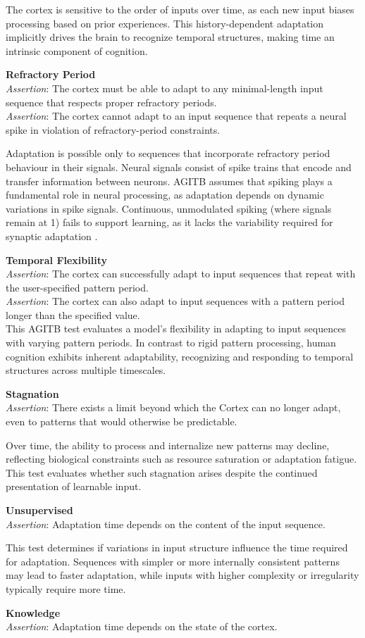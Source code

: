 \documentclass{article}
\newcommand{\agitbtest}[2]{
  \item
  \begin{minipage}[t]{\linewidth}
    \textbf{#1} \\[0.5ex]
    #2
  \end{minipage}
}
\begin{document}
\begin{agitblist}
{The cortex is sensitive to the order of inputs over time, as each new input biases processing based on prior experiences. This history-dependent adaptation implicitly drives the brain to recognize temporal structures, making time an intrinsic component of cognition.
}
\agitbtest{Refractory Period}{
\emph{Assertion}: The cortex must be able to adapt to any minimal-length input sequence that respects proper refractory periods.\\
\emph{Assertion}: The cortex cannot adapt to an input sequence that repeats a neural spike in violation of refractory-period constraints.

Adaptation is possible only to sequences that incorporate refractory period behaviour in their signals. Neural signals consist of spike trains that encode and transfer information between neurons. AGITB assumes that spiking plays a fundamental role in neural processing, as adaptation depends on dynamic variations in spike signals. Continuous, unmodulated spiking (where signals remain at 1) fails to support learning, as it lacks the variability required for synaptic adaptation \cite{Gerstner2002}. 
}
\agitbtest{Temporal Flexibility}{
\emph{Assertion}: The cortex can successfully adapt to input sequences that repeat with the user-specified pattern period.\\
\emph{Assertion}: The cortex can also adapt to input sequences with a pattern period longer than the specified value.\\

This AGITB test evaluates a model’s flexibility in adapting to input sequences with varying pattern periods. In contrast to rigid pattern processing, human cognition exhibits inherent adaptability, recognizing and responding to temporal structures across multiple timescales.
}
\agitbtest{Stagnation}{
\emph{Assertion}: There exists a limit beyond which the Cortex can no longer adapt, even to patterns that would otherwise be predictable.

Over time, the ability to process and internalize new patterns may decline, reflecting biological constraints such as resource saturation or adaptation fatigue. This test evaluates whether such stagnation arises despite the continued presentation of learnable input.
}
\agitbtest{Unsupervised}{
\emph{Assertion}: Adaptation time depends on the content of the input sequence.

This test determines if variations in input structure influence the time required for adaptation. Sequences with simpler or more internally consistent patterns may lead to faster adaptation, while inputs with higher complexity or irregularity typically require more time. 
}
\agitbtest{Knowledge}{
\emph{Assertion}: Adaptation time depends on the state of the cortex.

}
\end{agitblist}
\end{document}
